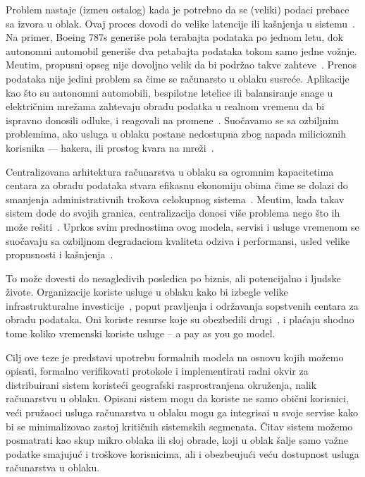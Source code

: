 Problem nastaje (izme\dj u ostalog) kada je potrebno da se (veliki) podaci prebace sa izvora u oblak. Ovaj proces dovodi do velike latencije ili ka\v snjenja u sistemu~\cite {HossainRH18}. Na primer, Boeing 787s generi\v se pola terabajta podataka po jednom letu, dok autonomni automobil generiše dva petabajta podataka tokom samo jedne vo\v znje. Me\dj utim, propusni opseg nije dovoljno velik da bi podr\v zao takve zahteve~\cite {CaoZS18}. Prenos podataka nije jedini problem sa \v cime se ra\v cunarsto u oblaku susre\'ce. Aplikacije kao \v sto su autonomni automobili, bespilotne letelice ili balansiranje snage u elektri\v cnim mre\v zama zahtevaju obradu podatka u realnom vremenu da bi ispravno donosili odluke, i reagovali na promene~\cite {CaoZS18}. Suo\v cavamo se sa ozbiljnim problemima, ako usluga u oblaku postane nedostupna zbog napada milicioznih korisnika --- hakera, ili prostog kvara na mre\v zi~\cite{GunawiHSLSAE16}.

Centralizovana arhitektura ra\v cunarstva u oblaku sa ogromnim kapacitetima centara za obradu podataka stvara efikasnu ekonomiju obima \v cime se dolazi do smanjenja administrativnih tro\v kova celokupnog sistema~\cite{BariBEGPRZZ13}. Me\dj utim, kada takav sistem dod\dj e do svojih granica, centralizacija donosi vi\v se problema nego \v sto ih mo\v ze re\v siti~\cite{GunawiHSLSAE16, LopezMEDHIBFR15}. Uprkos svim prednostima ovog modela, servisi i usluge vremenom se suo\v cavaju sa ozbiljnom degradaciom kvaliteta odziva i performansi, usled velike propusnosti i ka\v snjenja~\cite {KarimIWGSYO16}. 

To mo\v ze dovesti do nesagledivih posledica po biznis, ali potencijalno i ljudske živote. Organizacije koriste usluge u oblaku kako bi izbegle velike infrastrukturalne investicije~\cite {MonsalveCC18}, poput pravljenja i održavanja sopstvenih centara za obradu podataka. Oni koriste resurse koje su obezbedili drugi~\cite{Satyanarayanan17}, i pla\'caju shodno tome koliko vremenski koriste usluge -- a pay as you go model.

Cilj ove teze je predstavi upotrebu formalnih modela na osnovu kojih mo\v zemo opisati, formalno verifikovati protokole i implementirati radni okvir za distribuirani sistem koriste\'ci geografski rasprostranjena okru\v zenja, nalik ra\v cunarstvu u oblaku. Opisani sistem mogu da koriste ne samo obi\v cni korisnici, ve\'ci pru\v zaoci usluga ra\v cunarstva u oblaku mogu ga integrisai u svoje servise kako bi se minimalizovao zastoj kritičnih sistemskih segmenata. \v Citav sistem mo\v zemo posmatrati kao skup mikro oblaka ili sloj obrade, koji u oblak \v salje samo va\v zne podatke smajuju\'c i tro\v skove korisnicima, ali i obezbe\dj uju\'ci ve\'cu dostupnost usluga ra\v cunarstva u oblaku.

